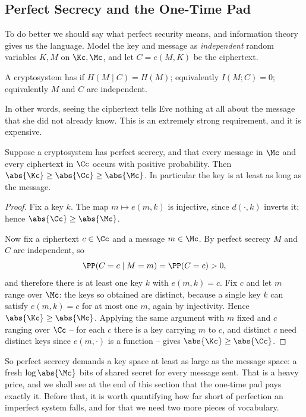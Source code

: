 \subsection{Perfect Secrecy and the One-Time Pad}

To do better we should say what perfect security means, and information theory gives us the language. Model the key and message as \emph{independent} random variables $K, M$ on $\Kc,\Mc$, and let $C = e(M,K)$ be the ciphertext.

\begin{definition}
	A cryptosystem has  if $H(M\mid C) = H(M)$; equivalently $I(M;C)=0$; equivalently $M$ and $C$ are independent.
\end{definition}

In other words, seeing the ciphertext tells Eve nothing at all about the message that she did not already know. This is an extremely strong requirement, and it is expensive.

\begin{proposition}[Shannon]\label{prop:keylength}
	Suppose a cryptosystem has perfect secrecy, and that every message in $\Mc$ and every ciphertext in $\Cc$ occurs with positive probability. Then $\abs{\Kc}\ge\abs{\Cc}\ge\abs{\Mc}$. In particular the key is at least as long as the message.
\end{proposition}

\begin{proof}
	Fix a key $k$. The map $m \mapsto e(m,k)$ is injective, since $d(\cdot,k)$ inverts it; hence $\abs{\Cc}\ge\abs{\Mc}$.

	Now fix a ciphertext $c \in \Cc$ and a message $m \in \Mc$. By perfect secrecy $M$ and $C$ are independent, so
	$$\PP(C = c \mid M = m) = \PP(C = c) > 0,$$
	and therefore there is at least one key $k$ with $e(m,k) = c$. Fix $c$ and let $m$ range over $\Mc$: the keys so obtained are distinct, because a single key $k$ can satisfy $e(m,k) = c$ for at most one $m$, again by injectivity. Hence $\abs{\Kc}\ge\abs{\Mc}$. Applying the same argument with $m$ fixed and $c$ ranging over $\Cc$ -- for each $c$ there is a key carrying $m$ to $c$, and distinct $c$ need distinct keys since $e(m,\cdot)$ is a function -- gives $\abs{\Kc}\ge\abs{\Cc}$.
\end{proof}

So perfect secrecy demands a key space at least as large as the message space: a fresh $\log\abs{\Mc}$ bits of shared secret for every message sent. That is a heavy price, and we shall see at the end of this section that the one-time pad pays exactly it. Before that, it is worth quantifying how far short of perfection an imperfect system falls, and for that we need two more pieces of vocabulary.

